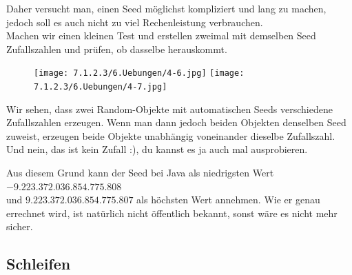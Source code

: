 \documentclass{scrartcl}   %
\begin{document}
\begin{itemize}
    Daher versucht man, einen Seed möglichst kompliziert und lang zu machen, jedoch soll es auch nicht zu viel Rechenleistung verbrauchen.\\
    
    Machen wir einen kleinen Test und erstellen zweimal mit demselben Seed Zufallszahlen und prüfen, ob dasselbe herauskommt.
    
    \begin{figure}[ht]
	    \centering
	    \texttt{[image: 7.1.2.3/6.Uebungen/4-6.jpg]}
	    \hspace{1cm}
	    \texttt{[image: 7.1.2.3/6.Uebungen/4-7.jpg]}
    \end{figure}
    
    Wir sehen, dass zwei Random-Objekte mit automatischen Seeds verschiedene \glqq Zufallszahlen\grqq{} erzeugen. Wenn man dann jedoch beiden Objekten denselben Seed zuweist, erzeugen beide Objekte unabhängig voneinander dieselbe \glqq Zufallszahl\grqq{}. Und nein, das ist kein Zufall :), du kannst es ja auch mal ausprobieren.
    
    Aus diesem Grund kann der Seed bei Java als niedrigsten Wert $-9.223.372.036.854.775.808$\\
    und $9.223.372.036.854.775.807$ als höchsten Wert annehmen. Wie er genau errechnet wird, ist natürlich nicht öffentlich bekannt, sonst wäre es nicht mehr sicher.
\end{itemize}

\newpage

\subsection{Schleifen}
\end{document}
